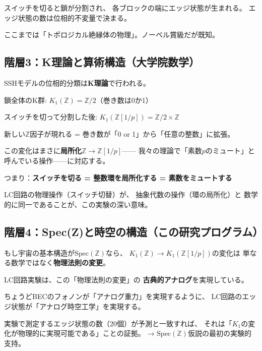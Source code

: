 \documentclass[12pt,a4paper]{article}
\newcommand{\Spec}{\mathrm{Spec}}
\begin{document}
スイッチを切ると鎖が分割され、
各ブロックの端にエッジ状態が生まれる。
エッジ状態の数は位相的不変量で決まる。

ここまでは「トポロジカル絶縁体の物理」。ノーベル賞級だが既知。

\subsection{階層3：K理論と算術構造（大学院数学）}

\begin{deepbox}
SSHモデルの位相的分類は\textbf{K理論}で行われる。

鎖全体のK群: $K_1(\mathbb{Z}) = \mathbb{Z}/2$（巻き数は0か1）

スイッチを切って分割した後:
$K_1(\mathbb{Z}[1/p]) = \mathbb{Z}/2 \times \mathbb{Z}$

新しい$\mathbb{Z}$因子が現れる = 巻き数が「0 or 1」から「任意の整数」に拡張。

この変化はまさに\textbf{局所化}$\mathbb{Z} \to \mathbb{Z}[1/p]$——
我々の理論で「素数$p$のミュート」と呼んでいる操作——に対応する。

つまり：\textbf{スイッチを切る = 整数環を局所化する = 素数をミュートする}

LC回路の物理操作（スイッチ切替）が、
抽象代数の操作（環の局所化）と
数学的に同一であることが、この実験の深い意味。
\end{deepbox}

\subsection{階層4：Spec(Z)と時空の構造（この研究プログラム）}

\begin{deepbox}
もし宇宙の基本構造が$\Spec(\mathbb{Z})$なら、
$K_1(\mathbb{Z}) \to K_1(\mathbb{Z}[1/p])$の変化は
単なる数学ではなく\textbf{物理法則の変更}。

LC回路実験は、この「物理法則の変更」の
\textbf{古典的アナログ}を実現している。

ちょうどBECのフォノンが「アナログ重力」を実現するように、
LC回路のエッジ状態が「アナログ時空工学」を実現する。

実験で測定するエッジ状態の数（20個）が予測と一致すれば、
それは「$K_1$の変化が物理的に実現可能である」ことの証拠。
→ $\Spec(\mathbb{Z})$仮説の最初の実験的支持。
\end{deepbox}

\end{document}
